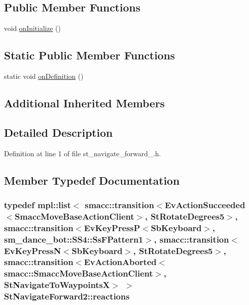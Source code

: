 \subsection*{Public Member Functions}
\begin{DoxyCompactItemize}
\item 
void \hyperlink{structStNavigateForward2_ac08065dc561a98ca39edaed1982aa986}{on\+Initialize} ()
\end{DoxyCompactItemize}
\subsection*{Static Public Member Functions}
\begin{DoxyCompactItemize}
\item 
static void \hyperlink{structStNavigateForward2_a4597cb073668e5defd0fc55dd1129c6f}{on\+Definition} ()
\end{DoxyCompactItemize}
\subsection*{Additional Inherited Members}


\subsection{Detailed Description}


Definition at line 1 of file st\+\_\+navigate\+\_\+forward\+\_.\+h.



\subsection{Member Typedef Documentation}
\subsubsection[{\texorpdfstring{reactions}{reactions}}]{\setlength{\rightskip}{0pt plus 5cm}typedef mpl\+::list$<$ {\bf smacc\+::transition}$<$Ev\+Action\+Succeeded$<$Smacc\+Move\+Base\+Action\+Client$>$, {\bf St\+Rotate\+Degrees5}$>$, {\bf smacc\+::transition}$<$Ev\+Key\+PressP$<$Sb\+Keyboard$>$, {\bf sm\+\_\+dance\+\_\+bot\+::\+S\+S4\+::\+Ss\+F\+Pattern1}$>$, {\bf smacc\+::transition}$<$Ev\+Key\+PressN$<$Sb\+Keyboard$>$, {\bf St\+Rotate\+Degrees5}$>$, {\bf smacc\+::transition}$<$Ev\+Action\+Aborted$<${\bf smacc\+::\+Smacc\+Move\+Base\+Action\+Client}$>$, {\bf St\+Navigate\+To\+WaypointsX}$>$ $>$ {\bf St\+Navigate\+Forward2\+::reactions}}\hypertarget{structStNavigateForward2_a95ac001eebeb059d623ae3332b2b353f}{}\label{structStNavigateForward2_a95ac001eebeb059d623ae3332b2b353f}


